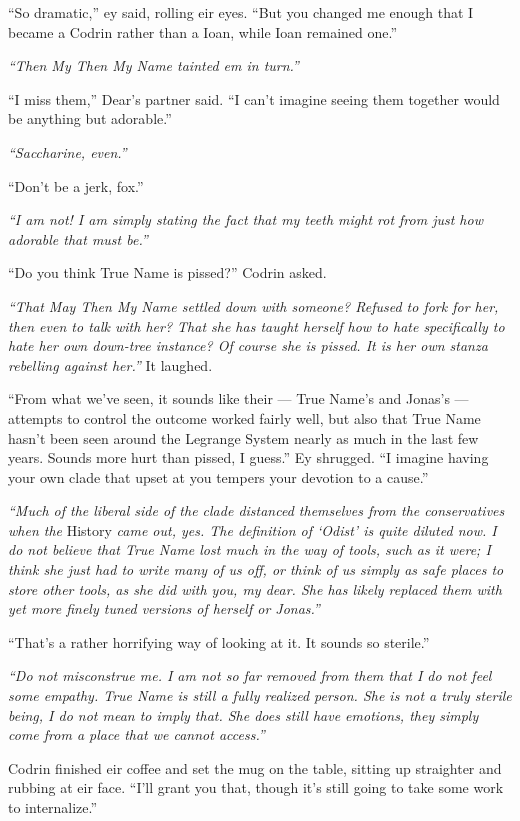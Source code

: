 ``So dramatic,'' ey said, rolling eir eyes. ``But you changed me enough that I became a Codrin rather than a Ioan, while Ioan remained one.''

\emph{``Then My Then My Name tainted em in turn.''}

``I miss them,'' Dear's partner said. ``I can't imagine seeing them together would be anything but adorable.''

\emph{``Saccharine, even.''}

``Don't be a jerk, fox.''

\emph{``I am not! I am simply stating the fact that my teeth might rot from just how adorable that must be.''}

``Do you think True Name is pissed?'' Codrin asked.

\emph{``That May Then My Name settled down with someone? Refused to fork for her, then even to talk with her? That she has taught herself how to hate specifically to hate her own down-tree instance? Of course she is pissed. It is her own stanza rebelling against her.''} It laughed.

``From what we've seen, it sounds like their — True Name's and Jonas's — attempts to control the outcome worked fairly well, but also that True Name hasn't been seen around the Legrange System nearly as much in the last few years. Sounds more hurt than pissed, I guess.'' Ey shrugged. ``I imagine having your own clade that upset at you tempers your devotion to a cause.''

\emph{``Much of the liberal side of the clade distanced themselves from the conservatives when the} History \emph{came out, yes. The definition of `Odist' is quite diluted now. I do not believe that True Name lost much in the way of tools, such as it were; I think she just had to write many of us off, or think of us simply as safe places to store other tools, as she did with you, my dear. She has likely replaced them with yet more finely tuned versions of herself or Jonas.''}

``That's a rather horrifying way of looking at it. It sounds so sterile.''

\emph{``Do not misconstrue me. I am not so far removed from them that I do not feel some empathy. True Name is still a fully realized person. She is not a truly sterile being, I do not mean to imply that. She does still have emotions, they simply come from a place that we cannot access.''}

Codrin finished eir coffee and set the mug on the table, sitting up straighter and rubbing at eir face. ``I'll grant you that, though it's still going to take some work to internalize.''

